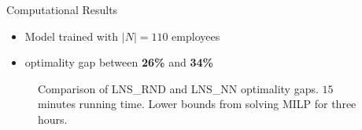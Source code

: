 \documentclass[aspectratio=1610]{beamer}
\begin{document}
\begin{frame}{Computational Results}
	\begin{itemize}
		\item Model trained with $|N| = 110$ employees
		\item {} optimality gap between \textbf{26\%} and \textbf{34\%}
	\end{itemize}
	\begin{figure}
		\caption{Comparison of LNS\_RND and LNS\_NN optimality gaps. $15$ minutes running time. Lower bounds from solving MILP for three hours.}
	\end{figure}
\end{frame}
\end{document}
